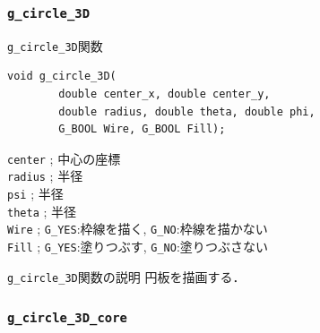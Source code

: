 \documentclass[platex,a4paper,12pt]{jsarticle}%
\begin{document}
\clearpage
\subsubsection{\texttt{g\_circle\_3D}}

\begin{itembox}[l]{\texttt{g\_circle\_3D}関数}
\begin{verbatim}
void g_circle_3D(
        double center_x, double center_y,
        double radius, double theta, double phi, 
        G_BOOL Wire, G_BOOL Fill);
\end{verbatim}
\verb|center| ; 中心の座標\\
\verb|radius| ; 半径\\
\verb|psi| ; 半径\\
\verb|theta| ; 半径\\
\verb|Wire| ; \verb|G_YES|:枠線を描く, \verb|G_NO|:枠線を描かない \\
\verb|Fill| ; \verb|G_YES|:塗りつぶす, \verb|G_NO|:塗りつぶさない 
\end{itembox}

\begin{itembox}[l]{\texttt{g\_circle\_3D}関数の説明}
円板を描画する．
\end{itembox}






\clearpage
\subsubsection{\texttt{g\_circle\_3D\_core}}
\end{document}
